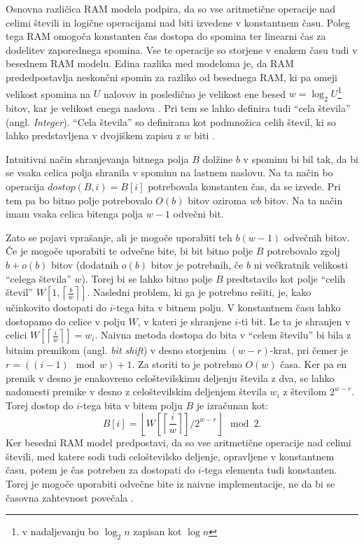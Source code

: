 Osnovna različica RAM modela podpira, da so vse aritmetične operacije nad celimi števili in logične operacijami nad biti izvedene v konstantnem času. Poleg tega RAM omogoča konstanten čas dostopa do spomina ter linearni čas za dodelitev zaporednega spomina. Vse te operacije so storjene v enakem času tudi v besednem RAM modelu. Edina razlika med modeloma je, da RAM prededpostavlja neskončni spomin za razliko od besednega RAM, ki pa omeji velikost spomina na $U$ nalovov in posledično je velikost ene besed $w=\log_2 U$\footnote{v nadaljevanju bo $\log_2 n$ zapisan kot $\log n$} bitov, kar je velikost enega naslova \cite{Fredman1990,Morin2013,Navarro2016}. Pri tem se lahko definira tudi \enquote{cela števila} (angl. \textit{Integer}). \enquote{Cela števila} so definirana kot podmnožica celih števil, ki so lahko predstavljena v dvojiškem zapisu z $w$ biti \cite{Navarro2016}.

Intuitivni način shranjevanja bitnega polja $B$ dolžine $b$ v spominu bi bil tak, da bi se vsaka celica polja shranila v spominu na lastnem naslovu. Na ta način bo operacija $dostop(B,i)=B[i]$ potrebovala konstanten čas, da se izvede. Pri tem pa bo bitno polje potrebovalo $O(b)$ bitov oziroma $wb$ bitov. Na ta način imam vsaka celica bitenga polja $w-1$ odvečni bit. 

Zato se pojavi vprašanje, ali je mogoče uporabiti teh $b(w-1)$ odvečnih bitov. Če je mogoče uporabiti te odvečne bite, bi bit bitno polje $B$ potrebovalo zgolj $b+o(b)$ bitov (dodatnih $o(b)$ bitov je potrebnih, če $b$ ni večkratnik velikosti \enquote{celega števila} $w$). Torej bi se lahko bitno polje $B$ predtstavilo kot polje \enquote{celih števil} $W\left[1,\left\lceil\frac{b}{w}\right\rceil\right]$. Nasledni problem, ki ga je potrebno rešiti, je, kako učinkovito dostopati do $i$-tega bita v bitnem polju. V konstantnem času lahko dostopamo do celice v polju $W$, v kateri je shranjene $i$-ti bit. Le ta je shranjen v celici $W\left[\left\lceil\frac{i}{w}\right\rceil\right]=w_i$. Naivna metoda dostopa do bita v \enquote{celem številu} bi bila z bitnim premikom (angl. \textit{bit shift}) v desno storjenim $(w-r)$-krat, pri čemer je $r=((i-1)\mod{w}) +1$. Za storiti to je potrebno $O(w)$ časa. Ker pa en premik v desno je enakovreno celoštevilskimu deljenju števila z dva, se lahko nadomesti premike v desno z celoštevilskim deljenjem števila $w_i$ z številom $2^{w-r}$. Torej dostop do $i$-tega bita v bitem polju $B$ je izračunan kot:
$$
    B[i]=\left\lfloor W\left[\left\lceil\frac{i}{w}\right\rceil\right]/2^{w-r}\right\rfloor \mod{2}.
$$
Ker besedni RAM model predpostavi, da so vse aritmetične operacije nad celimi števili, med katere sodi tudi celoštevilsko deljenje, opravljene v konstantnem času, potem je čas potreben za dostopati do $i$-tega elementa tudi konstanten. Torej je mogoče uporabiti odvečne bite iz naivne implementacije, ne da bi se časovna zahtevnost povečala \cite{Navarro2016}.


